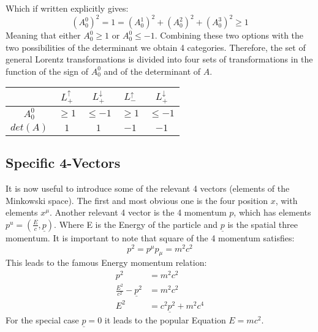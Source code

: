 Which if written explicitly gives:
\begin{equation}
    (A^0_0)^2 = 1 = (A^1_0)^2 + (A^2_0)^2 + (A^3_0)^2 \geq 1
\end{equation}
Meaning that either $A^0_0 \geq 1$ or $A^0_0\leq -1$. Combining these two options with the two possibilities of the determinant we obtain 4 categories. Therefore, the set of general Lorentz transformations is divided into four sets of transformations in the function of the sign of $A^0_0$ and of the determinant of $A$.
\begin{center}
  \begin{tabular}{ccccc}
    \toprule
      &$L^\uparrow_+$ & $L^\downarrow_+$ &$L^\uparrow_-$&$L^\downarrow_+$  \\ \midrule
     $A^0_0$& $\geq 1$ & $\leq -1$ & $\geq 1$ & $\leq -1$ \\
     $det(A)$ & $1$ &$1$ & $-1$& $-1$\\
     \bottomrule
\end{tabular}  
\end{center}

\subsection{Specific 4-Vectors}
It is now useful to introduce some of the relevant 4 vectors (elements of the Minkowski space). The first and most obvious one is the four position $x$, with elements $x^\mu$. Another relevant 4 vector is the 4 momentum $p$, which has elements $p^u = (\frac{E}{c},\underline p)$. Where E is the Energy of the particle and $\underline p$ is the spatial three momentum. It is important to note that square of the 4 momentum satisfies:
\begin{equation}
    p^2 = p^\mu p_\mu = m^2c^2
\end{equation}
This leads to the famous Energy momentum relation:
\begin{align}
    p^2 &= m^2c^2\\
    \frac{E^2}{c^2} - \underline p^2 &= m^2c^2\\
    E^2 &= c^2\underline p^2 +m^2c^4
\end{align}
For the special case $\underline p = 0$ it leads to the popular Equation $E= mc^2$.

